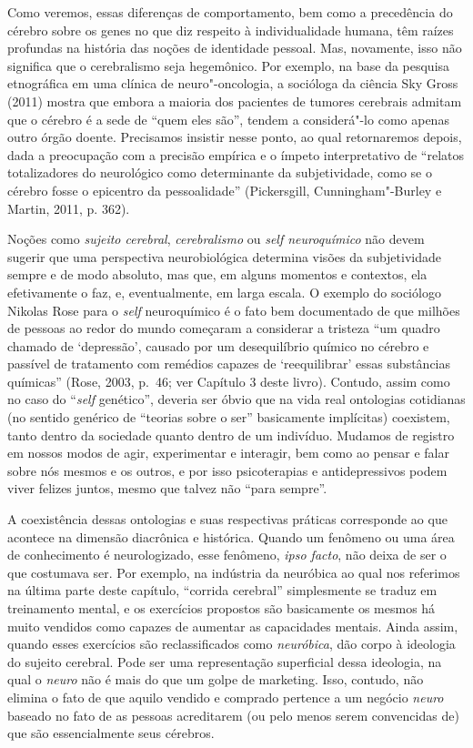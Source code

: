 Como veremos, essas diferenças de comportamento, bem como a precedência
do cérebro sobre os genes no que diz respeito à individualidade humana,
têm raízes profundas na história das noções de identidade pessoal. Mas,
novamente, isso não significa que o cerebralismo seja hegemônico. Por
exemplo, na base da pesquisa etnográfica em uma clínica de
neuro"-oncologia, a socióloga da ciência Sky Gross (2011) mostra que
embora a maioria dos pacientes de tumores cerebrais admitam que o
cérebro é a sede de ``quem eles são'', tendem a considerá"-lo como apenas
outro órgão doente. Precisamos insistir nesse ponto, ao qual
retornaremos depois, dada a preocupação com a precisão
empírica e o ímpeto interpretativo de ``relatos totalizadores do
neurológico como determinante da subjetividade, como se o cérebro fosse
o epicentro da pessoalidade'' (Pickersgill, Cunningham"-Burley e Martin,
2011, p. 362).

Noções como \emph{sujeito cerebral}, \emph{cerebralismo} ou \emph{self
neuroquímico} não devem sugerir que uma perspectiva neurobiológica
determina visões da subjetividade sempre e de modo absoluto, mas que, em
alguns momentos e contextos, ela efetivamente o faz, e, eventualmente,
em larga escala. O exemplo do sociólogo Nikolas Rose para o \emph{self}
neuroquímico é o fato bem documentado de que milhões de pessoas ao redor
do mundo começaram a considerar a tristeza ``um quadro chamado de
`depressão', causado por um desequilíbrio químico no cérebro e passível
de tratamento com remédios capazes de `reequilibrar' essas substâncias
químicas'' (Rose, 2003, p.~46; ver Capítulo 3 deste livro). Contudo, assim como
no caso do ``\emph{self} genético'', deveria ser óbvio que na vida real
ontologias cotidianas (no sentido genérico de ``teorias sobre o ser''
basicamente implícitas) coexistem, tanto dentro da sociedade quanto
dentro de um indivíduo. Mudamos de registro em nossos modos de agir,
experimentar e interagir, bem como ao pensar e falar sobre nós mesmos e
os outros, e por isso psicoterapias e antidepressivos podem viver
felizes juntos, mesmo que talvez não ``para sempre''.

A coexistência dessas ontologias e suas respectivas práticas corresponde
ao que acontece na dimensão diacrônica e histórica. Quando um fenômeno
ou uma área de conhecimento é neurologizado, esse fenômeno, \emph{ipso
facto}, não deixa de ser o que costumava ser. Por exemplo, na indústria da
neuróbica ao qual nos referimos na última parte deste capítulo,
``corrida cerebral'' simplesmente se traduz em treinamento mental, e os
exercícios propostos são basicamente os mesmos há muito vendidos como
capazes de aumentar as capacidades mentais. Ainda assim, quando esses
exercícios são reclassificados como \emph{neuróbica}, dão corpo à
ideologia do sujeito cerebral. Pode ser uma representação superficial
dessa ideologia, na qual o \emph{neuro} não é mais do que um golpe de
marketing. Isso, contudo, não elimina o fato de que aquilo vendido e
comprado pertence a um negócio \emph{neuro} baseado no fato de as pessoas
acreditarem (ou pelo menos serem convencidas de) que são essencialmente
seus cérebros.

